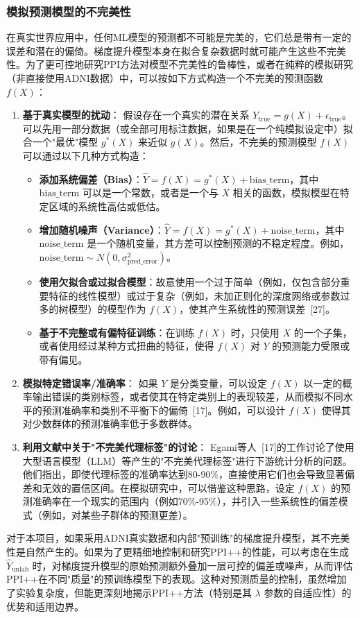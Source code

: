 \documentclass[12pt,a4paper]{article}
\begin{document}
\subsubsection{模拟预测模型的不完美性}
\label{sec:simulating_model_imperfection}
在真实世界应用中，任何ML模型的预测都不可能是完美的，它们总是带有一定的误差和潜在的偏倚。梯度提升模型本身在拟合复杂数据时就可能产生这些不完美性。为了更可控地研究PPI方法对模型不完美性的鲁棒性，或者在纯粹的模拟研究（非直接使用ADNI数据）中，可以按如下方式构造一个不完美的预测函数 $f(X)$：
\begin{enumerate}
    \item \textbf{基于真实模型的扰动}：
    假设存在一个真实的潜在关系 $Y_{\text{true}} = g(X) + \epsilon_{\text{true}}$。可以先用一部分数据（或全部可用标注数据，如果是在一个纯模拟设定中）拟合一个"最优"模型 $g^*(X)$ 来近似 $g(X)$。然后，不完美的预测模型 $f(X)$ 可以通过以下几种方式构造：
    \begin{itemize}
        \item \textbf{添加系统偏差（Bias）}：$\hat{Y} = f(X) = g^*(X) + \text{bias\_term}$，其中 $\text{bias\_term}$ 可以是一个常数，或者是一个与 $X$ 相关的函数，模拟模型在特定区域的系统性高估或低估。
        \item \textbf{增加随机噪声（Variance）}：$\hat{Y} = f(X) = g^*(X) + \text{noise\_term}$，其中 $\text{noise\_term}$ 是一个随机变量，其方差可以控制预测的不稳定程度。例如，$\text{noise\_term} \sim N(0, \sigma^2_{\text{pred\_error}})$。
        \item \textbf{使用欠拟合或过拟合模型}：故意使用一个过于简单（例如，仅包含部分重要特征的线性模型）或过于复杂（例如，未加正则化的深度网络或参数过多的树模型）的模型作为 $f(X)$，使其产生系统性的预测误差~{[27]}。
        \item \textbf{基于不完整或有偏特征训练}：在训练 $f(X)$ 时，只使用 $X$ 的一个子集，或者使用经过某种方式扭曲的特征，使得 $f(X)$ 对 $Y$ 的预测能力受限或带有偏见。
    \end{itemize}
    \item \textbf{模拟特定错误率/准确率}：
    如果 $Y$ 是分类变量，可以设定 $f(X)$ 以一定的概率输出错误的类别标签，或者使其在特定类别上的表现较差，从而模拟不同水平的预测准确率和类别不平衡下的偏倚~{[17]}。例如，可以设计 $f(X)$ 使得其对少数群体的预测准确率低于多数群体。
    \item \textbf{利用文献中关于"不完美代理标签"的讨论}：
    Egami等人~{[17]}的工作讨论了使用大型语言模型（LLM）等产生的"不完美代理标签"进行下游统计分析的问题。他们指出，即使代理标签的准确率达到80-90\%，直接使用它们也会导致显著偏差和无效的置信区间。在模拟研究中，可以借鉴这种思路，设定 $f(X)$ 的预测准确率在一个现实的范围内（例如70\%-95\%），并引入一些系统性的偏差模式（例如，对某些子群体的预测更差）。
\end{enumerate}
对于本项目，如果采用ADNI真实数据和内部"预训练"的梯度提升模型，其不完美性是自然产生的。如果为了更精细地控制和研究PPI++的性能，可以考虑在生成 $\hat{Y}_{\text{unlab}}$ 时，对梯度提升模型的原始预测额外叠加一层可控的偏差或噪声，从而评估PPI++在不同"质量"的预训练模型下的表现。这种对预测质量的控制，虽然增加了实验复杂度，但能更深刻地揭示PPI++方法（特别是其 $\lambda$ 参数的自适应性）的优势和适用边界。
\end{document}
